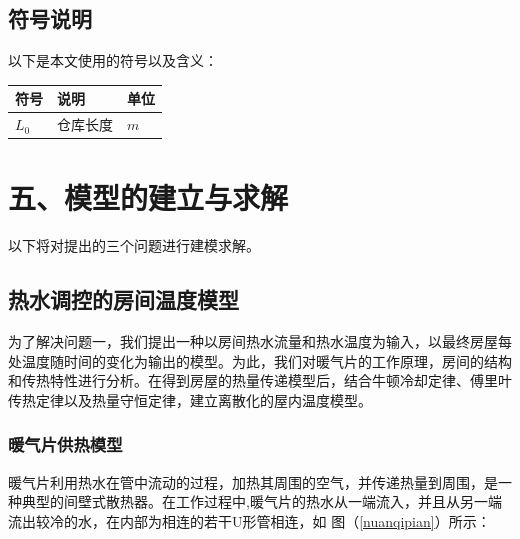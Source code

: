\documentclass{my_paper}
\begin{document}
\subsection{符号说明}
以下是本文使用的符号以及含义：
\begin{table}[h]%
    \centering
    \begin{tabular}{p{2.0cm}<{\centering}p{9.0cm}<{\centering}p{2.0cm}<{\centering}}
    \hline
    符号 & 说明 & 单位 \\ %
    \hline
    $L_0$ & 仓库长度 &  $m$\\
    
    \hline
    \end{tabular}
\end{table}

\section{五、模型的建立与求解}

以下将对提出的三个问题进行建模求解。
\subsection{热水调控的房间温度模型}

为了解决问题一，我们提出一种以房间热水流量和热水温度为输入，以最终房屋每处温度随时间的变化为输出的模型。为此，我们对暖气片的工作原理，房间的结构和传热特性进行分析。在得到房屋的热量传递模型后，结合牛顿冷却定律、傅里叶传热定律以及热量守恒定律，建立离散化的屋内温度模型。

\subsubsection{暖气片供热模型}

暖气片利用热水在管中流动的过程，加热其周围的空气，并传递热量到周围，是一种典型的间壁式散热器\cite{2}。在工作过程中,暖气片的热水从一端流入，并且从另一端流出较冷的水，在内部为相连的若干U形管相连，如 图（\ref{nuanqipian}）所示：
\end{document}
